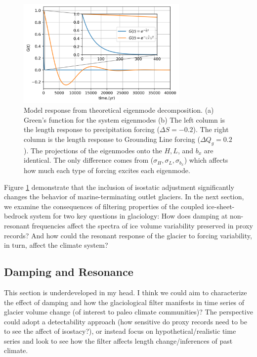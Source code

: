 \documentclass[tc, manuscript]{copernicus}
\begin{document}
\begin{figure}[t]
\includegraphics[width=8.3cm]{../figures/greens_function.png}
\caption{Model response from theoretical eigenmode decomposition. (a) Green's function for the system eigenmodes (b)
The left column is the length response to precipitation forcing ($\Delta S = −0.2$). 
The right column is the length response to Grounding Line forcing ($\Delta Q_g = 0.2$).
The projections of the eigenmodes onto the $H, L$, and $b_x$ are identical. The only difference comes from ($\sigma_H, \sigma_L, \sigma_{b_x}$) which affects how much each type of forcing excites each eigenmode.}
\label{fig:linear}
\end{figure}



Figure \ref{fig:linear} demonstrate that the inclusion of isostatic adjustment significantly changes the behavior of marine-terminating outlet glaciers. 
In the next section, we examine the consequences of filtering properties of the coupled ice-sheet-bedrock system for two key questions in glaciology: 
How does damping at non-resonant frequencies affect the spectra of ice volume variability preserved in proxy records?
And how could the resonant response of the glacier to forcing variability, in turn, affect the climate system?


\subsection{Damping and Resonance}

This section is underdeveloped in my head. I think we could aim to characterize the effect of damping and how the glaciological filter manifests in time series of glacier volume change (of interest to paleo climate communities)? The perspective could adopt a detectability approach (how sensitive do proxy records need to be to see the affect of isostacy?), or instead focus on hypothetical/realistic time series and look to see how the filter affects length change/inferences of past climate.
\end{document}
